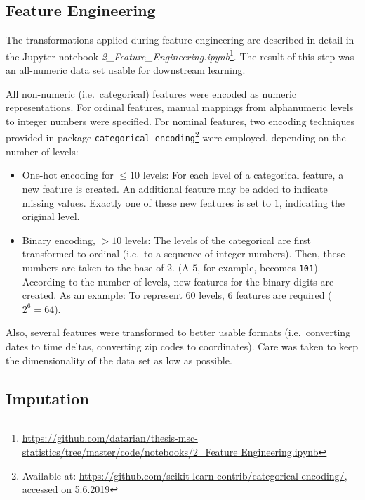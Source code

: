 \documentclass[
  11pt,
  a4paper,
  DIV=12,captions=tableheading,oneside,titlepage]{scrbook}
\begin{document}
\hypertarget{methods-feature-engineering}{%
\subsection{Feature Engineering}\label{methods-feature-engineering}}

The transformations applied during feature engineering are described in detail in the Jupyter notebook \emph{2\_Feature\_Engineering.ipynb}\footnote{\href{https://github.com/datarian/thesis-msc-statistics/tree/master/code/notebooks/2_Feature\%20Engineering.ipynb}{https://github.com/datarian/thesis-msc-statistics/tree/master/code/notebooks/2\_Feature Engineering.ipynb}}. The result of this step was an all-numeric data set usable for downstream learning.

All non-numeric (i.e.~categorical) features were encoded as numeric representations. For ordinal features, manual mappings from alphanumeric levels to integer numbers were specified. For nominal features, two encoding techniques provided in package \texttt{categorical-encoding}\footnote{Available at: \url{https://github.com/scikit-learn-contrib/categorical-encoding/}, accessed on 5.6.2019} were employed, depending on the number of levels:

\begin{itemize}
\item
  One-hot encoding for \(\leq 10\) levels: For each level of a categorical feature, a new feature is created. An additional feature may be added to indicate missing values. Exactly one of these new features is set to \(1\), indicating the original level.
\item
  Binary encoding, \(> 10\) levels: The levels of the categorical are first transformed to ordinal (i.e.~to a sequence of integer numbers). Then, these numbers are taken to the base of 2. (A \(5\), for example, becomes \texttt{101}). According to the number of levels, new features for the binary digits are created. As an example: To represent 60 levels, 6 features are required (\(2^6=64\)).
\end{itemize}

Also, several features were transformed to better usable formats (i.e.~converting dates to time deltas, converting zip codes to coordinates). Care was taken to keep the dimensionality of the data set as low as possible.

\hypertarget{imputation}{%
\subsection{Imputation}\label{imputation}}
\end{document}
